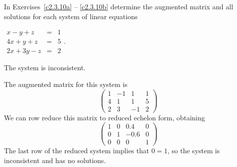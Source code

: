 \documentclass{ximera}
\begin{document}
\noindent In Exercises~\ref{c2.3.10a} -- \ref{c2.3.10b} determine the
augmented matrix and all solutions for each system of linear equations
\begin{exercise} \label{c2.3.10a}
$\begin{array}{rcl}
x-y+z & = & 1 \\
4x+y+z & = & 5 \\
   2x+3y-z & = & 2 \end{array}$.


\begin{solution}
\ans The system is inconsistent.

\soln The augmented matrix for this system is
\[
\left(\begin{array}{rrr|r} 1 & -1 & 1 & 1 \\ 4 & 1 & 1 & 5 \\
2 & 3 & -1 & 2\end{array}\right)
\]
We can row reduce this matrix to reduced echelon form, obtaining
\[
\left(\begin{array}{rrr|r} 1 & 0 & 0.4 & 0 \\
0 & 1 & -0.6 & 0 \\ 0 & 0 & 0 & 1\end{array}\right)
\]
The last row of the reduced system implies that $0 = 1$, so the system
is inconsistent and has no solutions.

\end{solution}
\end{exercise}
\end{document}
